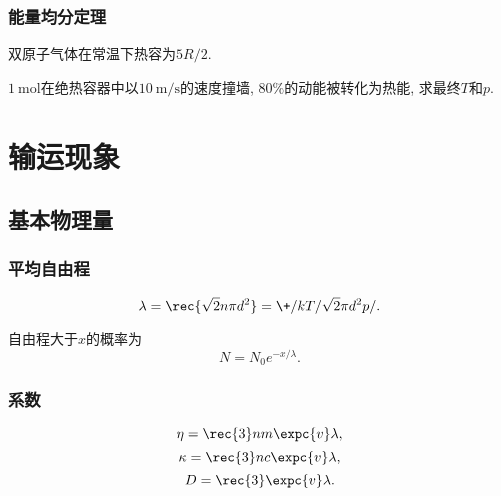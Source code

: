 \documentclass[hidelinks]{ctexart}
\begin{document}

\subsubsection{能量均分定理} %
\label{ssub:能量均分定理}

\begin{ex}
    双原子气体在常温下热容为$5R/2$.
\end{ex}
\begin{ex}
    $\SI{1}{\mol}$在绝热容器中以$\SI{10}{\meter\per\second}$的速度撞墙, $80\%$的动能被转化为热能, 求最终$T$和$p$.
\end{ex}




\section{输运现象} %
\label{sec:输运现象}

\subsection{基本物理量} %
\label{sub:基本物理量}

\subsubsection{平均自由程} %
\label{ssub:平均自由程}

\begin{finale}
    \[ \lambda = \rec{\sqrt{2}n\pi d^2} = \+/kT/\sqrt{2}\pi d^2 p/. \]
\end{finale}
\begin{finale}
    \begin{theorem}
        [碰撞概率分布] 自由程大于$x$的概率为
        \[ N = N_0 e^{-x/\lambda}. \]
    \end{theorem}
\end{finale}


\subsubsection{系数} %
\label{ssub:系数}

\begin{finale}
    \[ \eta = \rec{3}nm\expc{v}\lambda, \]
    \[ \kappa = \rec{3}nc\expc{v}\lambda, \]
    \[ D = \rec{3} \expc{v}\lambda. \]
\end{finale}
\end{document}
